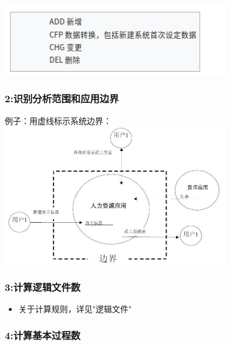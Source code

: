
\includegraphics[width=10cm]{Screenshotfrom2022122020-31-37.png}

\hypertarget{ux8bc6ux522bux5206ux6790ux8303ux56f4ux548cux5e94ux7528ux8fb9ux754c}{%
\subsubsection{2:识别分析范围和应用边界}\label{ux8bc6ux522bux5206ux6790ux8303ux56f4ux548cux5e94ux7528ux8fb9ux754c}}

例子：用虚线标示系统边界：\\

\includegraphics[width=10cm]{功能点计数P6220.jpg}

\hypertarget{ux8ba1ux7b97ux903bux8f91ux6587ux4ef6ux6570}{%
\subsubsection{3:计算逻辑文件数}\label{ux8ba1ux7b97ux903bux8f91ux6587ux4ef6ux6570}}

\begin{itemize}
\tightlist
\item
  关于计算规则，详见"逻辑文件"
\end{itemize}

\hypertarget{ux8ba1ux7b97ux57faux672cux8fc7ux7a0bux6570}{%
\subsubsection{4:计算基本过程数}\label{ux8ba1ux7b97ux57faux672cux8fc7ux7a0bux6570}}


